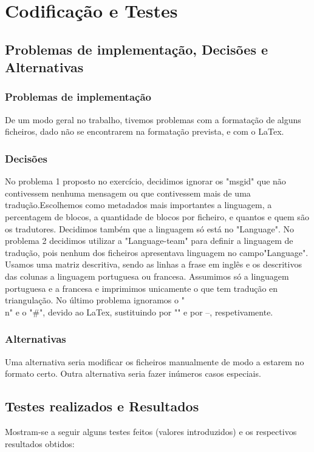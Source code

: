 \documentclass{report}
\begin{document}
\chapter{Codificação e Testes}
\section{Problemas de implementação, Decisões e Alternativas}
\subsection{Problemas de implementação}
De um modo geral no trabalho, tivemos problemas com a formatação de alguns ficheiros, dado não se encontrarem na formatação prevista, e com o LaTex.
\subsection{Decisões}
No problema 1 proposto no exercício, decidimos ignorar os "msgid" que não contivessem nenhuma mensagem ou que contivessem mais de uma tradução.Escolhemos como metadados mais importantes a linguagem, a percentagem de blocos, a quantidade de blocos por ficheiro, e quantos e quem são os tradutores. Decidimos também que a linguagem só está no "Language".
No problema 2 decidimos utilizar a "Language-team" para definir a linguagem de tradução, pois nenhum dos ficheiros apresentava linguagem no campo"Language". Usamos uma matriz descritiva, sendo as linhas a frase em inglês e os descritivos das colunas a linguagem portuguesa ou francesa. Assumimos só a linguagem portuguesa e a francesa e imprimimos unicamente o que tem tradução en triangulação.
No último problema ignoramos o "\\n" e o "\#", devido ao LaTex, sustituindo por "" e por --, respetivamente.
\subsection{Alternativas}
Uma alternativa seria modificar os ficheiros manualmente de modo a estarem no formato certo. Outra alternativa seria fazer inúmeros casos especiais.

\section{Testes realizados e Resultados}
Mostram-se a seguir alguns testes feitos (valores introduzidos) e os respectivos resultados obtidos:
\end{document}
